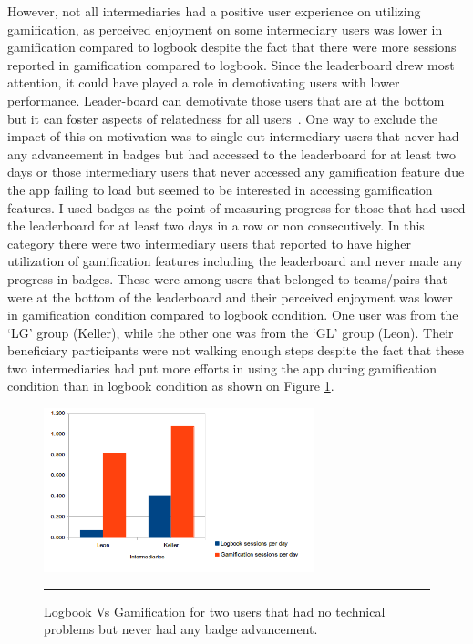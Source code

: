 However, not all intermediaries had a positive user experience on utilizing gamification, as perceived enjoyment on some intermediary users was lower in gamification compared to logbook despite the fact that there were more sessions reported in gamification compared to logbook. Since the leaderboard drew most attention, it could have played a role in demotivating users with lower performance. Leader-board can demotivate those users that are at the bottom but it can foster aspects of relatedness for all users~\citep{sailer2013:psychological}. One way to exclude the impact of this on motivation was to single out intermediary users that never had any advancement in badges but had accessed to the leaderboard for at least two days or those intermediary users that never accessed any gamification feature due the app failing to load but seemed to be interested in accessing gamification features. I used badges as the point of measuring progress for those that had used the leaderboard for at least two days in a row or non consecutively. In this category there were two intermediary users that reported to have higher utilization of gamification features including the leaderboard and never made any progress in badges. These were among users that belonged to teams/pairs that were at the bottom of the leaderboard and their perceived enjoyment was lower in gamification condition compared to logbook condition.  One user was from the `LG' group (Keller), while the other one was from the `GL' group (Leon).  Their beneficiary participants were not walking enough steps despite the fact that these two intermediaries had put  more efforts in using the app during gamification condition than in logbook condition as shown on Figure \ref{figure:badge_failure_2}. 
\begin{figure}[htbp]
  \centering
    \includegraphics[width=0.7\textwidth]{Figures/badgesfailures2.png}
    \rule{35em}{0.5pt}
  \caption{Logbook Vs Gamification for two users that had no technical problems but never had any badge advancement.}
  \label{figure:badge_failure_2}
\end{figure} 

